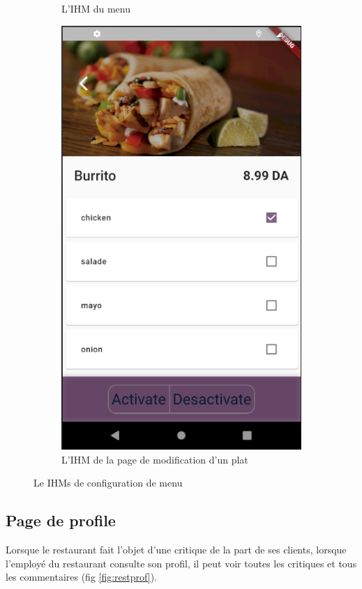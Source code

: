 \documentclass[french, a4paper, 12pt]{report}
\begin{document}
\begin{figure}[h!]
\begin{subfigure}{.5\textwidth}
  \caption{L'IHM du menu}
  \label{fig:restconfig}
\end{subfigure}%
\begin{subfigure}{.5\textwidth}
  \centering
  \includegraphics[width=.9\linewidth]{screenshots/Restaurantviews/ModifyDish.png}
  \caption{L'IHM de la page de modification d'un plat}
  \label{fig:restedit}
\end{subfigure}
\caption{Le IHMs de configuration de menu}
\label{fig:restmnu}
\end{figure}
		
	\subsection{Page de profile} Lorsque le restaurant fait l'objet d'une critique de la part de ses clients, lorsque l'employé du restaurant consulte son profil, il peut voir toutes les critiques et tous les commentaires (fig \ref{fig:restprof}).
	
\end{document}
